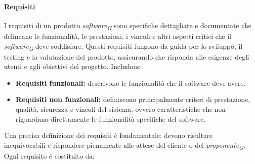 \paragraph{Requisiti}
I requisiti di un prodotto \textit{software}\textsubscript{\textit{G}} sono specifiche dettagliate e documentate che delineano le funzionalità, le prestazioni, i vincoli e altri aspetti critici che il \textit{software}\textsubscript{\textit{G}} deve soddisfare. Questi requisiti fungono da guida per lo sviluppo, il testing e la valutazione del prodotto, assicurando che risponda alle esigenze degli utenti e agli obiettivi del progetto.
Includono
\begin{itemize}
    \item \textbf{Requisiti funzionali:} descrivono le funzionalità che il software deve avere.
    \item \textbf{Requisiti non funzionali:} definiscono principalmente criteri di prestazione, qualità, sicurezza e vincoli del sistema, ovvero caratteristiche che non riguardano direttamente le funzionalità specifiche del software.
\end{itemize}
Una precisa definizione dei requisiti è fondamentale: devono risultare inequivocabili e rispondere pienamente alle attese del cliente o del \textit{proponente}\textsubscript{\textit{G}}.\\
Ogni requisito è costituito da:
